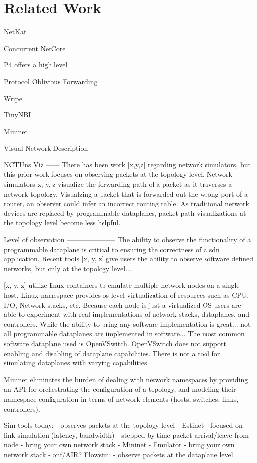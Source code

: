 \section{Related Work}

NetKat\cite{netkat}

Concurrent NetCore\cite{cnetcore}

P4\cite{p4} offers a high level

Protocol Oblivious Forwarding\cite{pof}

Wripe \cite{wripe}

TinyNBI \cite{tinynbi}

Mininet\cite{mininet}

Visual Network Description \cite{vnd}

NCTUns \cite{nctuns}
Viz
------
There has been work [x,y,z] regarding network simulators, but this prior work focuses on observing packets at the topology level. Network simulators x, y, z visualize the forwarding path of a packet as it traverses a network topology. Visualzing a packet that is forwarded out the wrong port of a router, an observer could infer an incorrect routing table. As traditional network devices are replaced by programmable dataplanes, packet path visualizations at the topology level become less helpful.

Level of observation
---------------------
The ability to observe the functionality of a programmable dataplane is 
critical to ensuring the correctness of a sdn application. 
Recent tools [x, y, z] give users the ability to observe software defined
networks, but only at the topology level....  

[x, y, z] utilize linux containers to emulate multiple network 
nodes on a single host. Linux namespace provides os level virtualization 
of resources such as CPU, I/O, Network stacks, etc. Because each node is 
just a virtualized OS users are able to experiment with real 
implementations of network stacks, dataplanes, and controllers. While 
the ability to bring any software implementation is great... not all
programmable dataplanes are implemented in software... 
The most common software dataplane used is OpenVSwitch. 
OpenVSwitch does not support enabling and disabling of dataplane capabilities.
There is not a tool for simulating dataplanes with varying capabilities.

Mininet eliminates the burden of dealing with network namespaces 
by providing an API for orchestrating the configuration of a topology, and 
modeling their namespace configuration in terms of network elements (hosts, 
switches, links, controllers). 

Sim tools today:
 - observes packets at the topology level 
 - Estinet
   - focused on link simulation (latency, bandwidth)
   - stepped by time packet arrival/leave from node
   - bring your own network stack 
 - Mininet
   - Emulator
   - bring your own network stack 
 - onf/AIR?
Flowsim:
 - observe packets at the dataplane level

